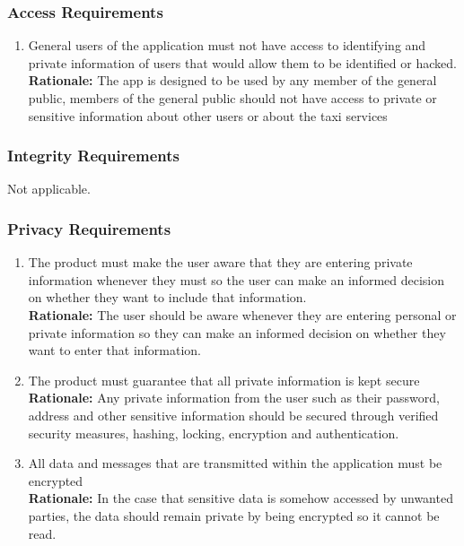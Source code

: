 \documentclass[]{article}
\begin{document}
\subsubsection{Access Requirements}
\label{ssub:access_requirements}
\begin{enumerate}[{SR-AC}1. ]
	\item General users of the application must not have access to identifying and private information of users that would allow them to be identified or hacked. \\
	{\bf Rationale:} The app is designed to be used by any member of the general public, members of the general public should not have access to private or sensitive information about other users or about the taxi services 
\end{enumerate}

\subsubsection{Integrity Requirements}
\label{ssub:integrity_requirements}
\color{red}Not applicable. \color{black}

\subsubsection{Privacy Requirements}
\label{ssub:privacy_requirements}
\begin{enumerate}[{SR-P}1. ]
	\item The product must make the user aware that they are entering private information whenever they must so the user can make an informed decision on whether they want to include that information. \\
	{\bf Rationale:} The user should be aware whenever they are entering personal or private information so they can make an informed decision on whether they want to enter that information.
	\item The product must guarantee that all private information is kept secure \\
	{\bf Rationale:} Any private information from the user such as their password, address and other sensitive information should be secured through verified security measures, hashing, locking, encryption and authentication.
    \item \color{red} All data and messages that are transmitted within the application must be encrypted \\
	{\bf Rationale:} \color{red} In the case that sensitive data is somehow accessed by unwanted parties, the data should remain private by being encrypted so it cannot be read.
\end{enumerate}
\end{document}

